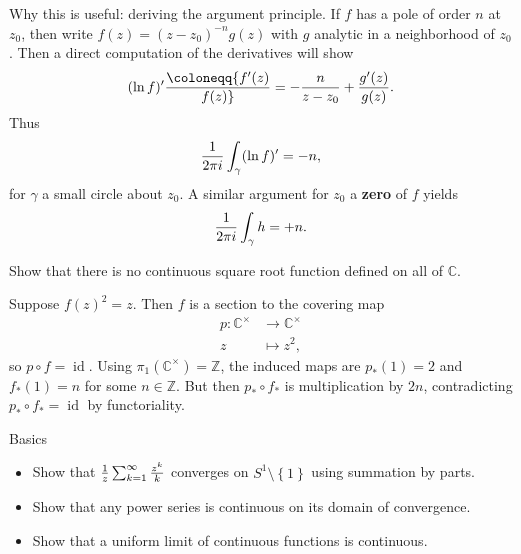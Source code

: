 \begin{remark}

Why this is useful: deriving the argument principle. If \(f\) has a pole
of order \(n\) at \(z_0\), then write \(f(z) = (z-z_0)^{-n} g(z)\) with
\(g\) analytic in a neighborhood of \(z_0\). Then a direct computation
of the derivatives will show
\begin{align*}
(\ln f)' \coloneqq{f'(z) \over f(z)} = -{n\over z-z_0} + {g'(z) \over g(z)}
.\end{align*}
Thus
\begin{align*}
{1\over 2\pi i } \int_\gamma (\ln f)' = -n
,\end{align*}
for \(\gamma\) a small circle about \(z_0\). A similar argument for
\(z_0\) a \textbf{zero} of \(f\) yields
\begin{align*}
{1\over 2\pi i } \int_\gamma h = +n
.\end{align*}

\end{remark}

\begin{exercise}[?]

Show that there is no continuous square root function defined on all of
\({\mathbb{C}}\).

\end{exercise}

\begin{solution}

Suppose \(f(z)^2 = z\). Then \(f\) is a section to the covering map
\begin{align*}
p: {\mathbb{C}}^{\times}&\to {\mathbb{C}}^{\times}\\
z & \mapsto z^2
,\end{align*}
so \(p\circ f = \operatorname{id}\). Using
\(\pi_1({\mathbb{C}}^{\times}) = {\mathbb{Z}}\), the induced maps are
\(p_*(1) = 2\) and \(f_*(1) = n\) for some \(n\in {\mathbb{Z}}\). But
then \(p_* \circ f_*\) is multiplication by \(2n\), contradicting
\(p_* \circ f_* = \operatorname{id}\) by functoriality.

\end{solution}

Basics

\begin{itemize}
\tightlist
\item
  Show that \({1\over z} \sum_{k=1}^\infty {z^k \over k}\) converges on
  \(S^1 \setminus\left\{{1}\right\}\) using summation by parts.
\item
  Show that any power series is continuous on its domain of convergence.
\item
  Show that a uniform limit of continuous functions is continuous.
\end{itemize}

